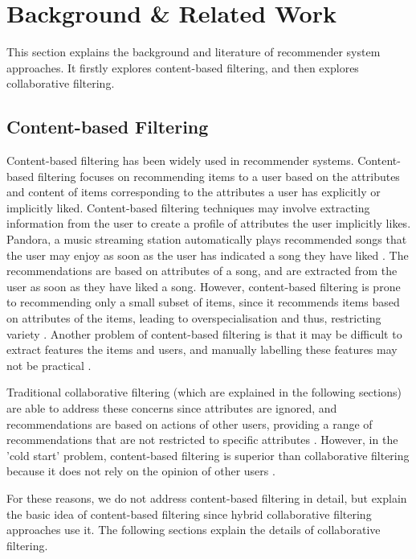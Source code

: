 \chapter{Background \& Related Work}\label{C:background}

This section explains the background and literature of recommender system approaches. It firstly explores content-based filtering, and then explores collaborative filtering. 

\section{Content-based Filtering}
Content-based filtering has been widely used in recommender systems. Content-based filtering focuses on recommending items to a user based on the attributes and content of items corresponding to the attributes a user has explicitly or implicitly liked. Content-based filtering techniques may involve extracting information from the user to create a profile of attributes the user implicitly likes. Pandora, a music streaming station automatically plays recommended songs that the user may enjoy as soon as the user has indicated a song they have liked . The recommendations are based on  attributes of a song, and are extracted from the user as soon as they have liked a song. However, content-based filtering is prone to recommending only a small subset of items, since it recommends items based on attributes of the items, leading to overspecialisation and thus, restricting variety \cite{toward}. Another problem of content-based filtering is that it may be difficult to extract features the items and users, and manually labelling these features may not be practical \cite{toward}.

Traditional collaborative filtering (which are explained in the following sections) are able to address these concerns since attributes are ignored, and recommendations are based on actions of other users, providing a range of recommendations that are not restricted to specific attributes \cite{koren2009matrix}. However, in the 'cold start' problem, content-based filtering is superior than collaborative filtering because it does not rely on the opinion of other users \cite{koren2009matrix}.

For these reasons, we do not address content-based filtering in detail, but explain the basic idea of content-based filtering since hybrid collaborative filtering approaches use it. The following sections explain the details of collaborative filtering.  

